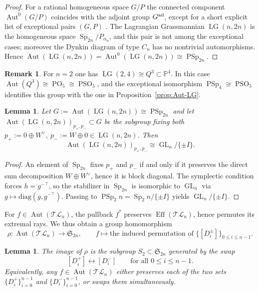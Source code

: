 \documentclass[10pt]{amsart}
\newtheorem{lemma}[theorem]{Lemma}
\theoremstyle{definition}
\newtheorem{remark}[theorem]{Remark}
\newcommand{\Eff}{\operatorname{Eff}}
\newcommand{\Aut}{\operatorname{Aut}}
\newcommand{\LG}{\operatorname{LG}}
\DeclareMathOperator{\Sp}{Sp}
\DeclareMathOperator{\PSp}{PSp}
\DeclareMathOperator{\PO}{PO}
\DeclareMathOperator{\PSO}{PSO}
\newcommand{\TL}{\mathcal{TL}}
\newcommand{\GL}{\operatorname{GL}}
\newcommand{\PP}{\mathbb{P}}
\theoremstyle{plain} %
\begin{document}
\begin{proof}
For a rational homogeneous space $G/P$ the connected component $\Aut^0(G/P)$ coincides with the adjoint group $G^{\rm ad}$, except for a short explicit list of exceptional pairs $(G,P)$ \cite[Theorem~1]{Dem77}. The Lagrangian Grassmannian $\LG(n,2n)$ is the homogeneous space $\Sp_{2n}/P_{\alpha_n}$, and this pair is not among the exceptional cases; moreover the Dynkin diagram of type $C_n$ has no nontrivial automorphisms. Hence $\Aut(\LG(n,2n))=\Aut^0(\LG(n,2n))\cong \PSp_{2n}$.
\end{proof}

\begin{remark}
For $n=2$ one has $\LG(2,4)\cong Q^3\subset \PP^4$.  In this case
$\Aut(Q^3)\cong \PO_5\cong \PSO_5$, and the exceptional isomorphism $\PSp_4\cong \PSO_5$ identifies
this group with the one in Proposition~\ref{prop:Aut-LG}.
\end{remark}

\begin{lemma}\label{lem:stab-two-points}
Let $G:=\Aut(\LG(n,2n))\cong \PSp_{2n}$ and let $\Aut(\LG(n,2n))_{p_+,p_-}\subset G$ be the subgroup
fixing both $p_+ := 0\oplus W^\vee,\: p_- := W\oplus0\in \LG(n,2n)$.  Then
\[
\Aut(\LG(n,2n))_{p_+,p_-} \cong \GL_n/\{\pm I\}.
\]
\end{lemma}
\begin{proof}
An element of $\Sp_{2n}$ fixes $p_+$ and $p_-$ if and only if it preserves the direct sum decomposition $W\oplus W^\vee$, hence it is block diagonal. The symplectic condition forces $h=g^{-\top}$, so the stabilizer in $\Sp_{2n}$ is isomorphic to $\GL_n$ via $g\mapsto \mathrm{diag}(g,g^{-\top})$. Passing to $\PSp_2n=\Sp_2n/\{\pm I\}$ yields $\GL_n/\{\pm I\}$.
\end{proof}

For $f\in \Aut(\TL_n)$, the pullback $f^*$ preserves $\Eff(\TL_n)$, hence permutes its
extremal rays.  We thus obtain a group homomorphism
\[
\rho \colon\Aut(\TL_n)\longrightarrow \mathfrak{S}_{2n},
\qquad
f\longmapsto \text{the induced permutation of }\{[D_i^\pm]\}_{0\le i\le n-1}.
\]

\begin{lemma}\label{lem:image-is-S2}
The image of $\rho$ is the subgroup $S_2\subset \mathfrak{S}_{2n}$ generated by the swap
\[
[D_i^+]\longleftrightarrow [D_i^-]\qquad\text{for all }0\le i\le n-1.
\]
Equivalently, any $f\in\Aut(\TL_n)$ either preserves each of the two sets
$\{D_i^+\}_{i=0}^{n-1}$ and $\{D_i^-\}_{i=0}^{n-1}$, or swaps them simultaneously.
\end{lemma}
\end{document}
